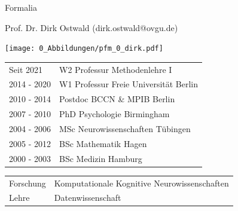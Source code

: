 \documentclass[
  8pt,
  ignorenonframetext,
]{beamer}
\begin{document}
\begin{frame}{Formalia}
\protect\hypertarget{formalia}{}
\vfill
\begin{large}
Prof. Dr. Dirk Ostwald (dirk.ostwald@ovgu.de)
\end{large}
\vspace{.7cm}

\begin{minipage}{.3\linewidth}
\begin{center}
\texttt{[image: 0\_Abbildungen/pfm\_0\_dirk.pdf]}
\end{center}
\end{minipage}
\begin{minipage}{.7\linewidth}
\begin{small}
\renewcommand{\arraystretch}{1.3}
\begin{tabular}{ll}
Seit 2021   & W2 Professur Methodenlehre I                    \\
2014 - 2020 & W1 Professur Freie Universität Berlin       \\
2010 - 2014 & Postdoc BCCN \& MPIB Berlin                       \\
2007 - 2010 & PhD Psychologie Birmingham                        \\
2004 - 2006 & MSc Neurowissenschaften Tübingen              \\
2005 - 2012 & BSc Mathematik Hagen                                \\
2000 - 2003 & BSc Medizin Hamburg                                   \\
\end{tabular}
\end{small}
\end{minipage}
\vspace{.7cm}

\begin{large}
\begin{tabular}{ll}
Forschung   & Komputationale Kognitive Neurowissenschaften  \\
Lehre         & Datenwissenschaft
\end{tabular}
\end{large}
\vfill
\end{frame}
\end{document}
